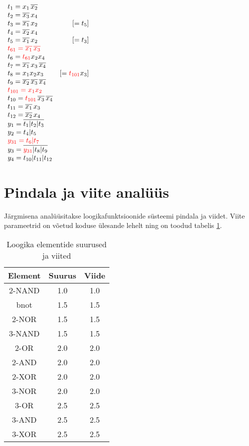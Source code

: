 \begin{multicols}{2}
\(\begin{array}{l r}
t_1 = x_1 \mathop{\overline{x_2}} \\
t_2 = \mathop{\overline{x_3}} x_4 \\
t_3 = \mathop{\overline{x_1}} x_2 & [=t_5]\\
t_4 = \mathop{\overline{x_2}} x_4 \\
t_5 = \mathop{\overline{x_1}} x_2 & [=t_3]\\
{\color{red}t_{61} = \mathop{\overline{x_1}} \mathop{\overline{x_3}}} \\
t_6 = {\color{red}t_{61}} x_2 x_4 \\
t_7 = \mathop{\overline{x_1}} x_3 \mathop{\overline{x_4}} \\ 
t_8 = x_1 x_2 x_3 & [= {\color{red}t_{101}} x_3]\\
t_9 = \mathop{\overline{x_2}} \mathop{\overline{x_3}} \mathop{\overline{x_4}} \\
{\color{red}t_{101} = x_1 x_2} \\
t_{10} = {\color{red}t_{101}} \mathop{\overline{x_3}} \mathop{\overline{x_4}} \\
t_{11} = \mathop{\overline{x_1}} x_3 \\
t_{12} = \mathop{\overline{x_2}} x_4 \\
y_1 = \mathop{\overline{t_1 | t_2 | t_3}} \\
y_2 = t_4 | t_5 \\ 
{\color{red}y_{31} = t_6 | t_7} \\
y_3 = \mathop{\overline{{\color{red}y_{31}} | t_8 | t_9}} \\
y_4 = t_{10} | t_{11} | t_{12} \\
\end{array}\)
\end{multicols}

\section{Pindala ja viite analüüs}
Järgmisena analüüsitakse loogikafunktsioonide süsteemi pindala ja viidet.
Viite parameetrid on võetud koduse ülesande lehelt ning on toodud
tabelis \ref{table:logic_elements}.

\begin{table}
\centering
\begin{tabular}{|c|c|c|}
\hline
Element & Suurus & Viide \\
\hline
2-NAND & 1.0 & 1.0 \\
\hline
bnot & 1.5 & 1.5 \\ 
2-NOR & 1.5 & 1.5 \\
3-NAND & 1.5 & 1.5 \\
\hline
2-OR & 2.0 & 2.0 \\
2-AND & 2.0 & 2.0 \\
2-XOR & 2.0 & 2.0 \\
3-NOR & 2.0 & 2.0 \\
\hline
3-OR & 2.5 & 2.5 \\
3-AND & 2.5 & 2.5 \\
3-XOR & 2.5 & 2.5 \\
\hline
\end{tabular}
\caption{Loogika elementide suurused ja viited}
\label{table:logic_elements}
\end{table}


